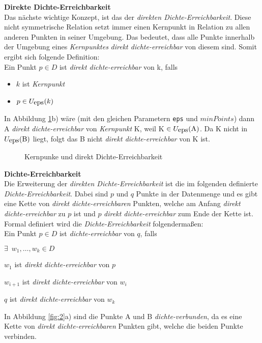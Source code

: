 \documentclass{lni}
\newcommand{\SubItem}[1]{
    {\setlength\itemindent{15pt} \item[-] #1}
}
\begin{document}
\textbf{Direkte Dichte-Erreichbarkeit}\\
Das nächste wichtige Konzept, ist das der \textit{direkten Dichte-Erreichbarkeit}. Diese nicht symmetrische Relation setzt immer einen Kernpunkt in Relation zu allen anderen Punkten in seiner Umgebung. Das bedeutet, dass alle Punkte innerhalb der Umgebung eines \textit{Kernpunktes} \textit{direkt dichte-erreichbar} von diesem sind. Somit ergibt sich folgende Definition:\\
Ein Punkt $ p \in D $ ist \textit{direkt dichte-erreichbar} von k, falls
\begin{itemize}
    \item $k$ ist \textit{Kernpunkt}
    \item $ p \in U_{\lstinline{eps}}(k) $
\end{itemize}
In Abbildung \ref{fig:1}b) wäre (mit den gleichen Parametern \lstinline{eps} und $minPoints$) dann A \textit{direkt dichte-erreichbar} von \textit{Kernpunkt} K, weil K $\in U_{\lstinline{eps}}(\text{A})$. Da K nicht in $U_{\lstinline{eps}}(\text{B})$ liegt, folgt das B nicht \textit{direkt dichte-erreichbar} von K ist.


\begin{figure}[H]
    \centering
    \subfloat[]{{}}%
    \qquad
    \subfloat[]{{}}
    \caption{Kernpunke und direkt Dichte-Erreichbarkeit}%
    \label{fig:1}%
\end{figure}


\textbf{Dichte-Erreichbarkeit}\\
Die Erweiterung der \textit{direkten Dichte-Erreichbarkeit} ist die im folgenden definierte \textit{Dichte-Erreichbarkeit}. Dabei sind $p$ und $q$ Punkte in der Datenmenge und es gibt eine Kette von \textit{direkt dichte-erreichbaren} Punkten, welche am Anfang \textit{direkt dichte-erreichbar} zu $p$ ist und $p$ \textit{direkt dichte-erreichbar} zum Ende der Kette ist. Formal definiert wird die \textit{Dichte-Erreichbarkeit} folgendermaßen:\\
Ein Punkt $ p \in D $ ist \textit{dichte-erreichbar} von $q$, falls
\begin{itemize}
    \item $\exists\enspace w_1,\dots,w_k \in D$
        \SubItem{$w_1$ ist \textit{direkt dichte-erreichbar} von $p$}
        \SubItem{$w_{i+1}$ ist \textit{direkt dichte-erreichbar} von $w_i$}
        \SubItem{$q$ ist \textit{direkt dichte-erreichbar} von $w_k$}
\end{itemize}
In Abbildung \ref{fig:2}a) sind die Punkte A und B \textit{dichte-verbunden}, da es eine Kette von \textit{direkt dichte-erreichbaren} Punkten gibt, welche die beiden Punkte verbinden.\\
\end{document}
